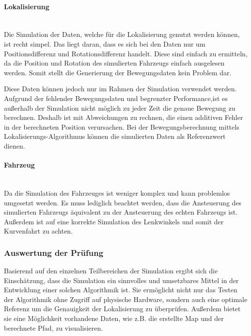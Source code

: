 \newpage
\paragraph{Lokalisierung} \mbox{}\\
Die Simulation der Daten, welche für die Lokalisierung genutzt werden können, ist recht simpel.
Das liegt daran, dass es sich bei den Daten nur um Positionsdifferenz und Rotationsdifferenz handelt.
Diese sind einfach zu ermitteln, da die Position und Rotation des simulierten Fahrzeugs einfach ausgelesen werden.
Somit stellt die Generierung der Bewegungsdaten kein Problem dar.

Diese Daten können jedoch nur im Rahmen der Simulation verwendet werden.
Aufgrund der fehlender Bewegungsdaten und begrenzter Performance,ist es außerhalb der Simulation nicht möglich zu jeder Zeit die genaue Bewegung zu berechnen. 
Deshalb ist mit Abweichungen zu rechnen, die einen additiven Fehler in der berechneten Position verursachen.
Bei der Bewegungsberechnung mittels Lokalisierungs-Algorithmus können die simulierten Daten als Referenzwert dienen.

\paragraph{Fahrzeug} \mbox{}\\
Da die Simulation des Fahrzeuges ist weniger komplex und kann problemlos umgesetzt werden.
Es muss lediglich beachtet werden, dass die Ansteuerung des simulierten Fahrzeugs äquivalent zu der Ansteuerung des echten Fahrzeugs ist.
Außerdem ist auf eine korrekte Simulation des Lenkwinkels und somit der Kurvenfahrt zu achten.

\subsubsection{Auswertung der Prüfung}
Basierend auf den einzelnen Teilbereichen der Simulation ergibt sich die Einschätzung, 
dass die Simulation ein sinnvolles und umsetzbares Mittel in der Entwicklung einer solchen Algorithmik ist.
Sie ermöglicht nicht nur das Testen der Algorithmik ohne Zugriff auf physische Hardware, 
sondern auch eine optimale Referenz um die Genauigkeit der Lokalisierung zu überprüfen.
Außerdem bietet sie eine Möglichkeit vorhandene Daten, wie z.B. die erstellte Map und der berechnete Pfad, zu visualisieren.
  
\newpage
